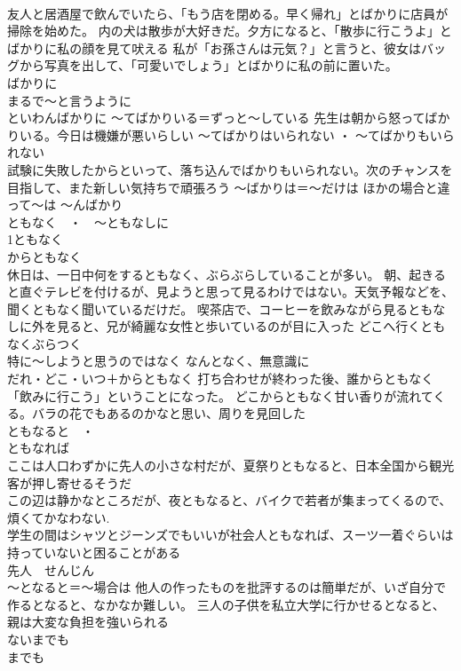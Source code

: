 \documentclass[8pt]{extreport}
\begin{document}
\begin{CJK}{UTF8}{min}
\\	友人と居酒屋で飲んでいたら、「もう店を閉める。早く帰れ」とばかりに店員が掃除を始めた。 内の犬は散歩が大好きだ。夕方になると、「散歩に行こうよ」とばかりに私の顔を見て吠える 私が「お孫さんは元気？」と言うと、彼女はバッグから写真を出して、「可愛いでしょう」とばかりに私の前に置いた。	
\\	ばかりに 
\\	まるで～と言うように 
\\	といわんばかりに	～てばかりいる＝ずっと～している 先生は朝から怒ってばかりいる。今日は機嫌が悪いらしい ～てばかりはいられない ・ ～てばかりもいられない 
\\	試験に失敗したからといって、落ち込んでばかりもいられない。次のチャンスを目指して、また新しい気持ちで頑張ろう ～ばかりは＝～だけは ほかの場合と違って～は ～んばかり
\\	ともなく　・　～ともなしに 
\\	1ともなく
\\	からともなく	
\\	休日は、一日中何をするともなく、ぶらぶらしていることが多い。 朝、起きると直ぐテレビを付けるが、見ようと思って見るわけではない。天気予報などを、聞くともなく聞いているだけだ。 喫茶店で、コーヒーを飲みながら見るともなしに外を見ると、兄が綺麗な女性と歩いているのが目に入った どこへ行くともなくぶらつく 
\\	特に～しようと思うのではなく なんとなく、無意識に 
\\	だれ・どこ・いつ＋からともなく 打ち合わせが終わった後、誰からともなく「飲みに行こう」ということになった。 どこからともなく甘い香りが流れてくる。バラの花でもあるのかなと思い、周りを見回した
\\	ともなると　・　
\\	ともなれば	
\\	ここは人口わずかに先人の小さな村だが、夏祭りともなると、日本全国から観光客が押し寄せるそうだ 
\\	この辺は静かなところだが、夜ともなると、バイクで若者が集まってくるので、煩くてかなわない. 
\\	学生の間はシャツとジーンズでもいいが社会人ともなれば、スーツ一着ぐらいは持っていないと困ることがある 
\\	先人　せんじん　
\\	～となると＝～場合は 他人の作ったものを批評するのは簡単だが、いざ自分で作るとなると、なかなか難しい。 三人の子供を私立大学に行かせるとなると、親は大変な負担を強いられる　
\\	ないまでも 
\\	までも	

\end{CJK}
\end{document}
